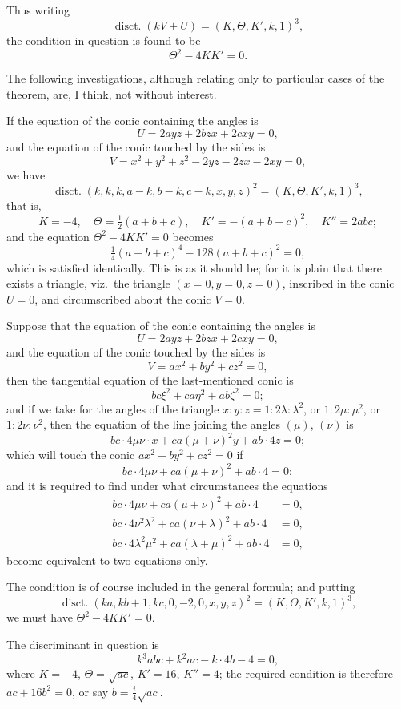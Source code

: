 \documentclass[11pt,a4paper]{book}
\providecommand{\between}{,}
\begin{document}
{{Thus writing
\[
\operatorname{disct.} (kV+U) = (K, \Theta, K' \between k, 1)^3,
\]
the condition in question is found to be
\[
\Theta^2 - 4KK' = 0.
\]

The following investigations, although relating only to particular cases of the theorem, are, I think, not without interest.

If the equation of the conic containing the angles is
\[
U = 2ayz + 2bzx + 2cxy = 0,
\]
and the equation of the conic touched by the sides is
\[
V = x^2 + y^2 + z^2 - 2yz - 2zx - 2xy = 0,
\]
we have
\[
\operatorname{disct.} (k,k,k,a-k,b-k,c-k \between x,y,z)^2 = (K, \Theta, K' \between k, 1)^3,
\]
that is,
\[
K = -4, \quad \Theta = \tfrac{1}{2}(a+b+c), \quad K' = -(a+b+c)^2, \quad K'' = 2abc;
\]
and the equation $\Theta^2 - 4KK' = 0$ becomes
\[
\tfrac{1}{4}(a+b+c)^4 - 128(a+b+c)^2 = 0,
\]
which is satisfied identically. This is as it should be; for it is plain that there exists a triangle, viz.\ the triangle $(x=0, y=0, z=0)$, inscribed in the conic $U=0$, and circumscribed about the conic $V=0$.

Suppose that the equation of the conic containing the angles is
\[
U = 2ayz + 2bzx + 2cxy = 0,
\]
and the equation of the conic touched by the sides is
\[
V = ax^2 + by^2 + cz^2 = 0,
\]
then the tangential equation of the last-mentioned conic is
\[
bc\xi^2 + ca\eta^2 + ab\zeta^2 = 0;
\]
and if we take for the angles of the triangle $x:y:z = 1:2\lambda:\lambda^2$, or $1:2\mu:\mu^2$, or $1:2\nu:\nu^2$, then the equation of the line joining the angles $(\mu)$, $(\nu)$ is
\[
bc \cdot 4\mu\nu \cdot x + ca(\mu+\nu)^2 y + ab \cdot 4z = 0;
\]
which will touch the conic $ax^2 + by^2 + cz^2 = 0$ if
\[
bc \cdot 4\mu\nu + ca(\mu+\nu)^2 + ab \cdot 4 = 0;
\]
and it is required to find under what circumstances the equations
\begin{align*}
bc \cdot 4\mu\nu + ca(\mu+\nu)^2 + ab \cdot 4 &= 0, \\
bc \cdot 4\nu^2\lambda^2 + ca(\nu+\lambda)^2 + ab \cdot 4 &= 0, \\
bc \cdot 4\lambda^2\mu^2 + ca(\lambda+\mu)^2 + ab \cdot 4 &= 0,
\end{align*}
become equivalent to two equations only.

The condition is of course included in the general formula; and putting
\[
\operatorname{disct.} (ka, kb+1, kc, 0, -2, 0 \between x,y,z)^2 = (K, \Theta, K' \between k, 1)^3,
\]
we must have $\Theta^2 - 4KK' = 0$.

The discriminant in question is
\[
k^3 abc + k^2 ac - k \cdot 4b - 4 = 0,
\]
where $K = -4$, $\Theta = \sqrt{ac}$, $K' = 16$, $K'' = 4$; the required condition is therefore $ac + 16b^2 = 0$, or say $b = \frac{i}{4}\sqrt{ac}$.

}}
\end{document}
